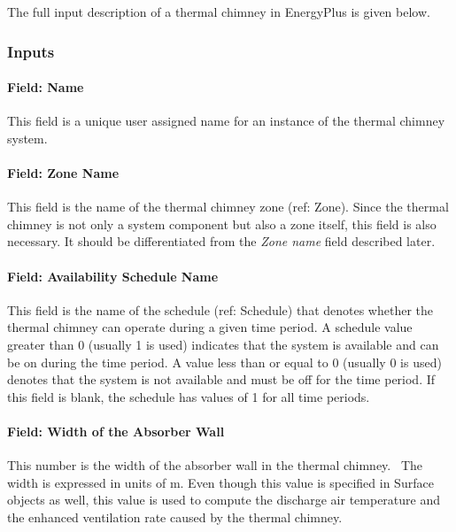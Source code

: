 The full input description of a thermal chimney in EnergyPlus is given below.

\subsubsection{Inputs}

\paragraph{Field: Name}\label{field-name-9-002}

This field is a unique user assigned name for an instance of the thermal chimney system.

\paragraph{Field: Zone Name}\label{field-zone-name-7}

This field is the name of the thermal chimney zone (ref: Zone). Since the thermal chimney is not only a system component but also a zone itself, this field is also necessary. It should be differentiated from the \emph{Zone name} field described later.

\paragraph{Field: Availability Schedule Name}\label{field-availability-schedule-name-1-000}

This field is the name of the schedule (ref: Schedule) that denotes whether the thermal chimney can operate during a given time period. A schedule value greater than 0 (usually 1 is used) indicates that the system is available and can be on during the time period. A value less than or equal to 0 (usually 0 is used) denotes that the system is not available and must be off for the time period. If this field is blank, the schedule has values of 1 for all time periods.

\paragraph{Field: Width of the Absorber Wall}\label{field-width-of-the-absorber-wall}

This number is the width of the absorber wall in the thermal chimney.~ The width is expressed in units of m. Even though this value is specified in Surface objects as well, this value is used to compute the discharge air temperature and the enhanced ventilation rate caused by the thermal chimney.


